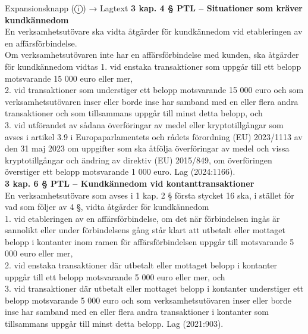 \documentclass[10pt]{beamer}
\begin{document}
\begin{frame}[label=riskfragor-steg3]
\begin{alertblock}{Expansionsknapp (ⓘ) → Lagtext}
    \tiny \textbf{3 kap. 4 § PTL – Situationer som kräver kundkännedom}\\
    \tiny En verksamhetsutövare ska vidta åtgärder för kundkännedom vid etableringen av en affärsförbindelse.\\

    Om verksamhetsutövaren inte har en affärsförbindelse med kunden, ska åtgärder för kundkännedom vidtas
    1. vid enstaka transaktioner som uppgår till ett belopp motsvarande 15 000 euro eller mer,\\
    2. vid transaktioner som understiger ett belopp motsvarande 15 000 euro och som verksamhetsutövaren 
    inser eller borde inse har samband med en eller flera andra transaktioner och som tillsammans uppgår 
    till minst detta belopp, och\\
    3. vid utförandet av sådana överföringar av medel eller kryptotillgångar som avses i artikel 3.9 i 
    Europaparlamentets och rådets förordning (EU) 2023/1113 av den 31 maj 2023 om uppgifter som 
    ska åtfölja överföringar av medel och vissa kryptotillgångar och ändring av direktiv (EU) 2015/849, 
    om överföringen överstiger ett belopp motsvarande 1 000 euro.
    Lag (2024:1166).\\[0.1cm]

    \tiny \textbf{3 kap. 6 § PTL – Kundkännedom vid kontanttransaktioner}\\
    \tiny En verksamhetsutövare som avses i 1 kap. 2 § första stycket 16 ska, i stället för vad som 
    följer av 4 §, vidta åtgärder för kundkännedom\\
    1. vid etableringen av en affärsförbindelse, om det när förbindelsen ingås är sannolikt eller under 
    förbindelsens gång står klart att utbetalt eller mottaget belopp i kontanter inom ramen för 
    affärsförbindelsen uppgår till motsvarande 5 000 euro eller mer,\\
    2. vid enstaka transaktioner där utbetalt eller mottaget belopp i kontanter uppgår till ett 
    belopp motsvarande 5 000 euro eller mer, och\\
    3. vid transaktioner där utbetalt eller mottaget belopp i kontanter understiger ett belopp 
    motsvarande 5 000 euro och som verksamhetsutövaren inser eller borde inse har samband med en 
    eller flera andra transaktioner i kontanter som tillsammans uppgår till minst detta belopp. Lag (2021:903).\\[0.1cm]


\end{alertblock}
\end{frame}
\end{document}
